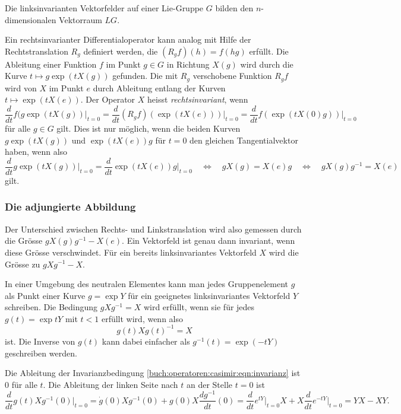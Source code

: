 \begin{definition}
Die linksinvarianten Vektorfelder auf einer Lie-Gruppe $G$ bilden 
den $n$-dimensionalen Vektorraum $LG$.
\end{definition}

Ein rechtsinvarianter Differentialoperator kann analog mit Hilfe
der Rechtstranslation $R_g$ definiert werden, die $(R_gf)(h) = f(hg)$
erfüllt.
Die Ableitung einer Funktion $f$ im Punkt $g\in G$ in Richtung $X(g)$
wird durch die Kurve $t\mapsto g\exp(tX(g))$ gefunden.
Die mit $R_g$ verschobene Funktion $R_gf$ wird von $X$ im Punkt $e$
durch Ableitung entlang der Kurven $t\mapsto \exp(tX(e))$.
Der Operator $X$ heisst {\em rechtsinvariant}, wenn 
\[
\frac{d}{dt} f(g\exp(tX(g))\bigg|_{t=0}
=
\frac{d}{dt} (R_gf)(\exp(tX(e)))\bigg|_{t=0}
=
\frac{d}{dt} f(\exp(tX(0)g))\bigg|_{t=0}
\]
für alle $g\in G$ gilt.
Dies ist nur möglich, wenn die beiden Kurven
$g\exp(tX(g))$
und 
$\exp(tX(e))g$
für $t=0$ den gleichen Tangentialvektor haben, wenn also
\[
\frac{d}{dt}g\exp(tX(g))\bigg|_{t=0}
=
\frac{d}{dt}\exp(tX(e))g\bigg|_{t=0}
\quad\Leftrightarrow\quad
gX(g) = X(e)g
\quad\Leftrightarrow\quad
gX(g)g^{-1} = X(e)
\]
gilt.

%
%
\subsubsection{Die adjungierte Abbildung}
Der Unterschied zwischen Rechts- und Linkstranslation wird also gemessen
durch die Grösse $gX(g)g^{-1}-X(e)$.
Ein Vektorfeld ist genau dann invariant, wenn diese Grösse verschwindet.
Für ein bereits linksinvariantes Vektorfeld $X$ wird die Grösse zu
$gXg^{-1}-X$.

In einer Umgebung des neutralen Elementes kann man jedes Gruppenelement
$g$ als Punkt einer Kurve $g=\exp Y$ für ein geeignetes linksinvariantes
Vektorfeld $Y$ schreiben.
Die Bedingung $gXg^{-1}=X$ wird erfüllt, wenn sie für jedes $g(t)=\exp tY$
mit $t<1$ erfüllt wird, wenn also
\begin{equation}
g(t)Xg(t)^{-1}=X
\label{buch:operatoren:casimir:eqn:invarianz}
\end{equation}
ist.
Die Inverse von $g(t)$ kann dabei einfacher als $g^{-1}(t)=\exp(-tY)$
geschreiben werden.

Die Ableitung der Invarianzbedingung
\eqref{buch:operatoren:casimir:eqn:invarianz}
ist $0$ für alle $t$.
Die Ableitung der linken Seite nach $t$ an der Stelle $t=0$ ist
\begin{equation}
\frac{d}{dt} g(t)Xg^{-1}(0)\bigg|_{t=0}
=
\dot{g}(0)Xg^{-1}(0)
+
g(0) X \frac{dg^{-1}}{dt}(0)
=
\frac{d}{dt}e^{tY}\bigg|_{t=0}
X
+
X
\frac{d}{dt}e^{-tY}\bigg|_{t=0}
=
YX-XY.
\label{buch:operatoren:casimir:eqn:innad}
\end{equation}

